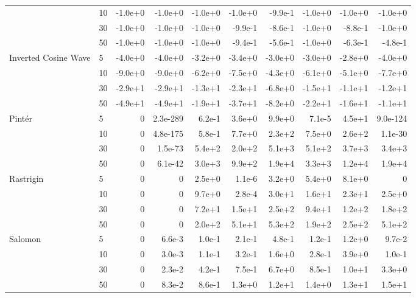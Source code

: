 {\begin{longtable}{llrrrrrrrr}
 & 10 & -1.0e{+}0 & -1.0e{+}0 & -1.0e{+}0 & -1.0e{+}0 & -9.9e{-}1 & -1.0e{+}0 & -1.0e{+}0 & -1.0e{+}0 \\*
 & 30 & -1.0e{+}0 & -1.0e{+}0 & -1.0e{+}0 & -9.9e{-}1 & -8.6e{-}1 & -1.0e{+}0 & -8.8e{-}1 & -1.0e{+}0 \\*
 & 50 & -1.0e{+}0 & -1.0e{+}0 & -1.0e{+}0 & -9.4e{-}1 & -5.6e{-}1 & -1.0e{+}0 & -6.3e{-}1 & -4.8e{-}1 \\
\midrule
\multirow{4}{*}{Inverted Cosine Wave} & 5 & -4.0e{+}0 & -4.0e{+}0 & -3.2e{+}0 & -3.4e{+}0 & -3.0e{+}0 & -3.0e{+}0 & -2.8e{+}0 & -4.0e{+}0 \\*
 & 10 & -9.0e{+}0 & -9.0e{+}0 & -6.2e{+}0 & -7.5e{+}0 & -4.3e{+}0 & -6.1e{+}0 & -5.1e{+}0 & -7.7e{+}0 \\*
 & 30 & -2.9e{+}1 & -2.9e{+}1 & -1.3e{+}1 & -2.3e{+}1 & -6.8e{+}0 & -1.5e{+}1 & -1.1e{+}1 & -1.2e{+}1 \\*
 & 50 & -4.9e{+}1 & -4.9e{+}1 & -1.9e{+}1 & -3.7e{+}1 & -8.2e{+}0 & -2.2e{+}1 & -1.6e{+}1 & -1.1e{+}1 \\
\midrule
\multirow{4}{*}{Pint\'er} & 5 & 0 & 2.3e{-}289 & 6.2e{-}1 & 3.6e{+}0 & 9.9e{+}0 & 7.1e{-}5 & 4.5e{+}1 & 9.0e{-}124 \\*
 & 10 & 0 & 4.8e{-}175 & 5.8e{-}1 & 7.7e{+}0 & 2.3e{+}2 & 7.5e{+}0 & 2.6e{+}2 & 1.1e{-}30 \\*
 & 30 & 0 & 1.5e{-}73 & 5.4e{+}2 & 2.0e{+}2 & 5.1e{+}3 & 5.1e{+}2 & 3.7e{+}3 & 3.4e{+}3 \\*
 & 50 & 0 & 6.1e{-}42 & 3.0e{+}3 & 9.9e{+}2 & 1.9e{+}4 & 3.3e{+}3 & 1.2e{+}4 & 1.9e{+}4 \\
\midrule
\multirow{4}{*}{Rastrigin} & 5 & 0 & 0 & 2.5e{+}0 & 1.1e{-}6 & 3.2e{+}0 & 5.4e{+}0 & 8.1e{+}0 & 0 \\*
 & 10 & 0 & 0 & 9.7e{+}0 & 2.8e{-}4 & 3.0e{+}1 & 1.6e{+}1 & 2.3e{+}1 & 2.5e{+}0 \\*
 & 30 & 0 & 0 & 7.2e{+}1 & 1.5e{+}1 & 2.5e{+}2 & 9.4e{+}1 & 1.2e{+}2 & 1.8e{+}2 \\*
 & 50 & 0 & 0 & 2.0e{+}2 & 5.1e{+}1 & 5.3e{+}2 & 1.9e{+}2 & 2.5e{+}2 & 5.1e{+}2 \\
\midrule
\multirow{4}{*}{Salomon} & 5 & 0 & 6.6e{-}3 & 1.0e{-}1 & 2.1e{-}1 & 4.8e{-}1 & 1.2e{-}1 & 1.2e{+}0 & 9.7e{-}2 \\*
 & 10 & 0 & 3.0e{-}3 & 1.1e{-}1 & 3.2e{-}1 & 1.6e{+}0 & 2.8e{-}1 & 3.9e{+}0 & 1.0e{-}1 \\*
 & 30 & 0 & 2.3e{-}2 & 4.2e{-}1 & 7.5e{-}1 & 6.7e{+}0 & 8.5e{-}1 & 1.0e{+}1 & 3.3e{+}0 \\*
 & 50 & 0 & 8.3e{-}2 & 8.6e{-}1 & 1.3e{+}0 & 1.2e{+}1 & 1.4e{+}0 & 1.3e{+}1 & 1.5e{+}1 \\

\end{longtable}}
